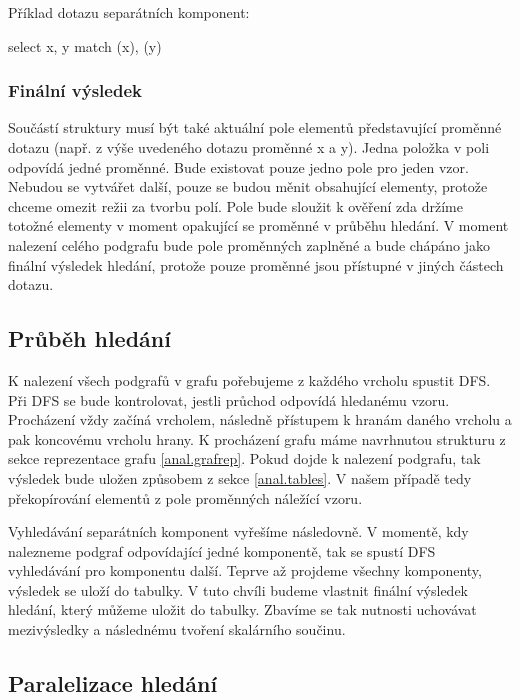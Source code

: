 Příklad dotazu separátních komponent:
\begin{code}
select x, y match (x), (y)
\end{code}

\subsubsection{Finální výsledek}

Součástí struktury musí být také aktuální pole elementů představující proměnné dotazu (např. z výše uvedeného dotazu proměnné x a y).
Jedna položka v poli odpovídá jedné proměnné.
Bude existovat pouze jedno pole pro jeden vzor. 
Nebudou se vytvářet další, pouze se budou měnit obsahující elementy, protože chceme omezit režii za tvorbu polí.
Pole bude sloužit k ověření zda držíme totožné elementy v moment opakující se proměnné v průběhu hledání.
V moment nalezení celého podgrafu bude pole proměnných zaplněné a bude chápáno jako finální výsledek hledání, protože pouze proměnné jsou přístupné v jiných částech dotazu.

\subsection{Průběh hledání}

K nalezení všech podgrafů v grafu pořebujeme z každého vrcholu spustit DFS.
Při DFS se bude kontrolovat, jestli průchod odpovídá hledanému vzoru.
Procházení vždy začíná vrcholem, následně přístupem k hranám daného vrcholu a pak koncovému vrcholu hrany. 
K procházení grafu máme navrhnutou strukturu z sekce reprezentace grafu \ref{anal.grafrep}.
Pokud dojde k nalezení podgrafu, tak výsledek bude uložen způsobem z sekce \ref{anal.tables}.
V našem případě tedy překopírování elementů z pole proměnných náležící vzoru.

Vyhledávání separátních komponent vyřešíme následovně.
V momentě, kdy nalezneme podgraf odpovídající jedné komponentě, tak se spustí DFS vyhledávání pro komponentu další.
Teprve až projdeme všechny komponenty, výsledek se uloží do tabulky.
V tuto chvíli budeme vlastnit finální výsledek hledání, který můžeme uložit do tabulky.
Zbavíme se tak nutnosti uchovávat mezivýsledky a následnému tvoření skalárního součinu.

\subsection{Paralelizace hledání} \label{anal.matchPar}

